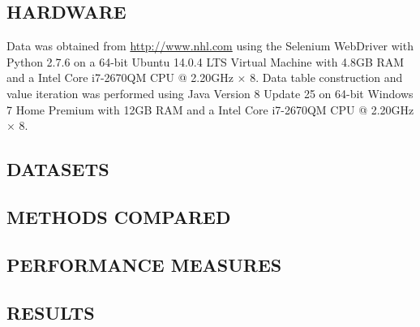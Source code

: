 \documentclass[]{article}
\begin{document}
\subsection{HARDWARE}

Data was obtained from \url{http://www.nhl.com} using the Selenium WebDriver with Python 2.7.6 \citep{Salunke2014} on a 64-bit Ubuntu 14.0.4 LTS Virtual Machine with 4.8GB RAM and a Intel Core i7-2670QM CPU @ 2.20GHz $\times$ 8. Data table construction and value iteration was performed using Java Version 8 Update 25 on 64-bit Windows 7 Home Premium with 12GB RAM and a Intel Core i7-2670QM CPU @ 2.20GHz $\times$ 8.


\subsection{DATASETS}





\subsection{METHODS COMPARED}


\subsection{PERFORMANCE MEASURES}


\subsection{RESULTS}

\end{document}
